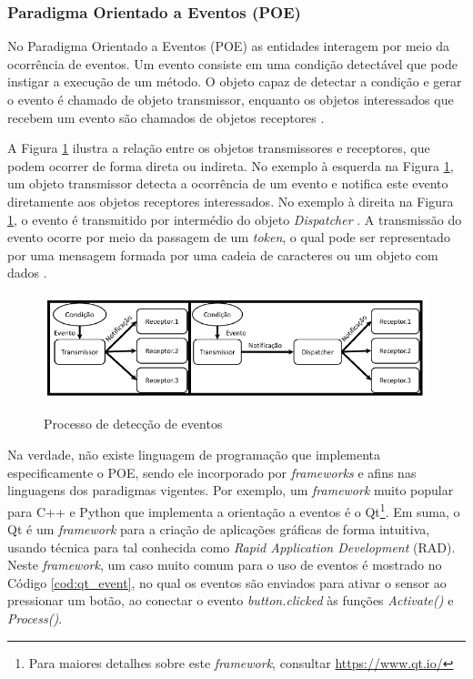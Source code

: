\subsubsection{Paradigma Orientado a Eventos (POE)}\label{sec:poe}

No Paradigma Orientado a Eventos (POE) as entidades interagem por meio da
ocorrência de eventos. Um evento consiste em uma condição detectável que pode
instigar a execução de um método. O objeto capaz de detectar a condição e gerar
o evento é chamado de objeto transmissor, enquanto os objetos interessados que
recebem um evento são chamados de objetos receptores \cite{ferg_2006}.

A Figura \ref{fig:eventos} ilustra a relação entre os objetos transmissores e
receptores, que podem ocorrer de forma direta ou indireta. No exemplo à esquerda
na Figura \ref{fig:eventos}, um objeto transmissor detecta a ocorrência de um
evento e notifica este evento diretamente aos objetos receptores interessados.
No exemplo à direita na Figura \ref{fig:eventos}, o evento é transmitido por
intermédio do objeto \textit{Dispatcher} \cite{msc_xavier_2014}. A transmissão
do evento ocorre por meio da passagem de um \textit{token}, o qual pode ser
representado por uma mensagem formada por uma cadeia de caracteres ou um objeto
com dados \cite{ferg_2006}.

\begin{figure}[!htb]
  \centering
  \caption{Processo de detecção de eventos}
  \includegraphics[width=\textwidth]{../figures/eventos.png}
  \label{fig:eventos}
\end{figure}
\FloatBarrier

Na verdade, não existe linguagem de programação que implementa especificamente o
POE, sendo ele incorporado por \textit{frameworks} e afins nas linguagens dos
paradigmas vigentes. Por exemplo, um \textit{framework} muito popular para C++ e
Python que implementa a orientação a eventos é o Qt\footnote{Para maiores
  detalhes sobre este \textit{framework}, consultar \url{https://www.qt.io/}}. Em
suma, o Qt é um \textit{framework} para a criação de aplicações gráficas de
forma intuitiva, usando técnica para tal conhecida como \textit{Rapid
  Application Development} (RAD). Neste \textit{framework}, um caso muito comum
para o uso de eventos é mostrado no Código \ref{cod:qt_event}, no qual os
eventos são enviados para ativar o sensor ao pressionar um botão, ao conectar o
evento \textit{button.clicked} às funções \textit{Activate()} e
\textit{Process()}.

